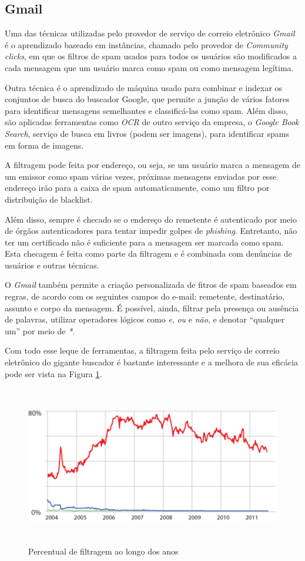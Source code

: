 \documentclass[a4paper,dvipdfm]{article}
\begin{document}
	\subsection{Gmail}
		Uma das técnicas utilizadas pelo provedor de serviço de correio eletrônico \emph{Gmail} é o aprendizado baseado em instâncias, chamado pelo provedor de \emph{Community clicks}, em que os filtros de spam usados para todos os usuários são modificados a cada mensagem que um usuário marca como spam ou como mensagem legítima.

		Outra técnica é o aprendizado de máquina usado para combinar e indexar os conjuntos de busca do buscador Google, que permite a junção de vários fatores para identificar mensagens semelhantes e classificá-las como spam.
		Além disso, são aplicadas ferramentas como \emph{OCR} de outro serviço da empresa, o \emph{Google Book Search}, serviço de busca em livros (podem ser imagens), para identificar spams em forma de imagens.

		A filtragem pode feita por endereço, ou seja, se um usuário marca a mensagem de um emissor como spam várias vezes, próximas mensagens enviadas por esse endereço irão para a caixa de spam automaticamente, como um filtro por distribuição de blacklist.

		Além disso, sempre é checado se o endereço do remetente é autenticado por meio de órgãos autenticadores para tentar impedir golpes de \emph{phishing}.
		Entretanto, não ter um certificado não é suficiente para a mensagem ser marcada como spam.
		Esta checagem é feita como parte da filtragem e é combinada com denúncias de usuários e outras técnicas.

		O \emph{Gmail} também permite a criação personalizada de fitros de spam baseados em regras, de acordo com os seguintes campos do e-mail: remetente, destinatário, assunto e corpo da mensagem. 
		É possível, ainda, filtrar pela presença ou ausência de palavras, utilizar operadores lógicos como \emph{e}, \emph{ou} e \emph{não}, e denotar ``qualquer um'' por meio de \emph{*}.

		Com todo esse leque de ferramentas, a filtragem feita pelo serviço de correio eletrônico do gigante buscador é bastante interessante e a melhora de sua eficácia pode ser vista na Figura \ref{gmail:chart}.

		\begin{figure}[ht]
			\centering
			\includegraphics[height=7cm]{Imagens/gmail/spamchart.png}
			\caption{Percentual de filtragem ao longo dos anos}
			\label{gmail:chart}
		\end{figure}
\end{document}
